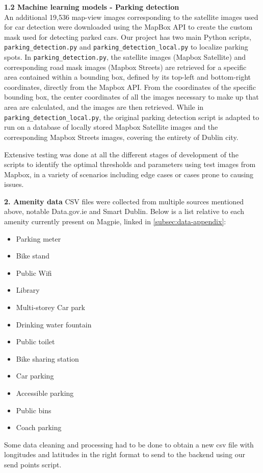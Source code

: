 \textbf{1.2 Machine learning models - Parking detection} \\
An additional 19,536 map-view images corresponding to the satellite images used
for car detection were downloaded using the MapBox API to create the custom mask
used for detecting parked cars. Our project has two main Python scripts,
\texttt{parking\_detection.py} and \texttt{parking\_detection\_local.py} to
localize parking spots. In \texttt{parking\_detection.py}, the satellite images
(Mapbox Satellite) and corresponding road mask images (Mapbox Streets) are
retrieved for a specific area contained within a bounding box, defined by its
top-left and bottom-right coordinates, directly from the Mapbox API. From the
coordinates of the specific bounding box, the center coordinates of all the
images necessary to make up that area are calculated, and the images are then
retrieved. While in \texttt{parking\_detection\_local.py}, the original parking
detection script is adapted to run on a database of locally stored Mapbox
Satellite images and the corresponding Mapbox Streets images, covering the
entirety of Dublin city.

Extensive testing was done at all the different stages of development of the
scripts to identify the optimal thresholds and parameters using test images from
Mapbox, in a variety of scenarios including edge cases or cases prone to causing
issues.

\newpage{}

\textbf{2. Amenity data}
CSV files were collected from multiple sources mentioned above, notable
Data.gov.ie and Smart Dublin. Below is a list relative to each amenity currently
present on Magpie, linked in \ref{subsec:data-appendix}:
\begin{itemize}
    \item Parking meter
    \item Bike stand
    \item Public Wifi
    \item Library
    \item Multi-storey Car park
    \item Drinking water fountain
    \item Public toilet
    \item Bike sharing station
    \item Car parking
    \item Accessible parking
    \item Public bins
    \item Coach parking
\end{itemize}
Some data cleaning and processing had to be done to obtain a new csv file with
longitudes and latitudes in the right format to send to the backend using our
send points script.

